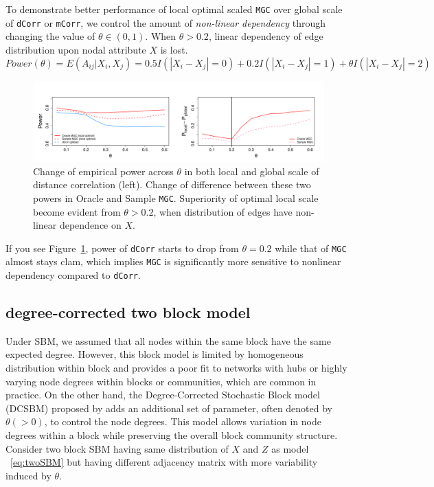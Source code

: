 \documentclass[12pt]{article}
\theoremstyle{definition}
\begin{document}
 To demonstrate better performance of local optimal scaled \texttt{MGC} over global scale of \texttt{dCorr} or \texttt{mCorr}, we control the amount of \textit{non-linear dependency} through changing the value of $\theta \in (0, 1)$. When $\theta > 0.2$, linear dependency of edge distribution upon nodal attribute $X$ is lost.
\begin{equation}
Power(\theta) = E(A_{ij} | X_{i}, X_{j}) = 0.5 I(|X_{i} - X_{j}| = 0) + 0.2 I(|X_{i} - X_{j}| = 1) + \theta I(|X_{i} - X_{j}| = 2)
\end{equation}

\begin{figure}[H]
	\centering
	\includegraphics[width=7in]{../Figure/powerplot.pdf}
	\caption{Change of empirical power across $\theta$ in both local and global scale of distance correlation (left). Change of difference between these two powers in Oracle and Sample \texttt{MGC}. Superiority of optimal local scale become evident from $\theta > 0.2$, when distribution of edges have non-linear dependence on $X$.}
	\label{fig:powerplot}
\end{figure}
If you see Figure~\ref{fig:powerplot}, power of \texttt{dCorr} starts to drop from $\theta = 0.2$ while that of \texttt{MGC} almost stays clam, which implies \texttt{MGC} is significantly more sensitive to nonlinear dependency compared to \texttt{dCorr}.

\subsection{degree-corrected two block model}

Under SBM, we assumed that all nodes within the same block have the same expected degree. However, this block model is limited by homogeneous distribution within block and provides a poor fit to networks with hubs or highly varying node degrees within blocks or communities, which are common in practice. On the other hand, the Degree-Corrected Stochastic Block model (DCSBM) proposed by \cite{karrer2011stochastic} adds an additional set of parameter, often denoted by $\theta (>0)$, to control the node degrees. This model allows variation in node degrees within a block while preserving the overall block community structure. Consider two block SBM having same distribution of $X$ and $Z$ as model ~\ref{eq:twoSBM} but having different adjacency matrix with more variability induced by $\theta$.
\end{document}
